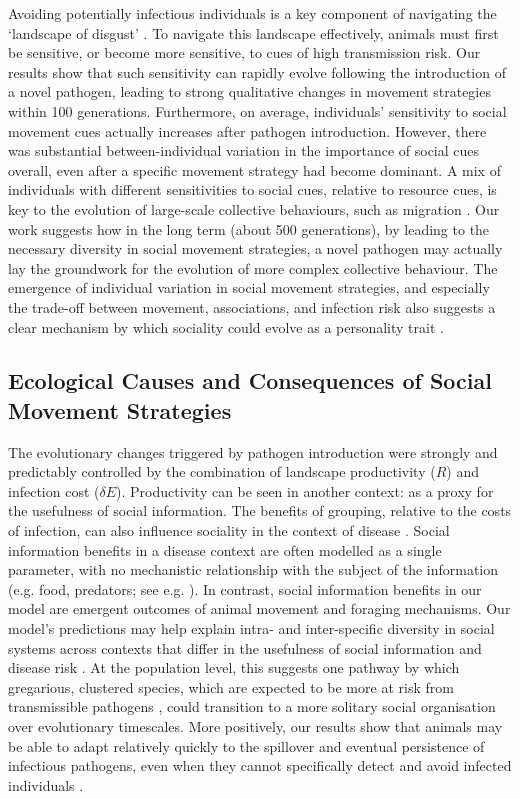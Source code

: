 Avoiding potentially infectious individuals is a key component of navigating the `landscape of disgust' \citep{weinstein2018}.
To navigate this landscape effectively, animals must first be sensitive, or become more sensitive, to cues of high transmission risk.
Our results show that such sensitivity can rapidly evolve following the introduction of a novel pathogen, leading to strong qualitative changes in movement strategies within 100 generations.
Furthermore, on average, individuals' sensitivity to social movement cues actually increases after pathogen introduction.
However, there was substantial between-individual variation in the importance of social cues overall, even after a specific movement strategy had become dominant.
A mix of individuals with different sensitivities to social cues, relative to resource cues, is key to the evolution of large-scale collective behaviours, such as migration \citep{guttal2010}.
Our work suggests how in the long term (about 500 generations), by leading to the necessary diversity in social movement strategies, a novel pathogen may actually lay the groundwork for the evolution of more complex collective behaviour.
The emergence of individual variation in social movement strategies, and especially the trade-off between movement, associations, and infection risk also suggests a clear mechanism by which sociality could evolve as a personality trait \citep[][]{gartland2021}.

\subsection*{Ecological Causes and Consequences of Social Movement Strategies}

The evolutionary changes triggered by pathogen introduction were strongly and predictably controlled by the combination of landscape productivity ($R$) and infection cost ($\delta E$).
Productivity can be seen in another context: as a proxy for the usefulness of social information.
The benefits of grouping, relative to the costs of infection, can also influence sociality in the context of disease \citep{almberg2015,ezenwa2016}.
Social information benefits in a disease context are often modelled as a single parameter, with no mechanistic relationship with the subject of the information (e.g. food, predators; see e.g. \citealt{ashby2022}). 
In contrast, social information benefits in our model are emergent outcomes of animal movement and foraging mechanisms.
Our model's predictions may help explain intra- and inter-specific diversity in social systems across contexts that differ in the usefulness of social information and disease risk \citep{lott1991, sah2018}.
At the population level, this suggests one pathway by which gregarious, clustered species, which are expected to be more at risk from transmissible pathogens \citep{sah2018}, could transition to a more solitary social organisation over evolutionary timescales.
More positively, our results show that animals may be able to adapt relatively quickly to the spillover and eventual persistence of infectious pathogens, even when they cannot specifically detect and avoid infected individuals \citep{stroeymeyt2018}.

